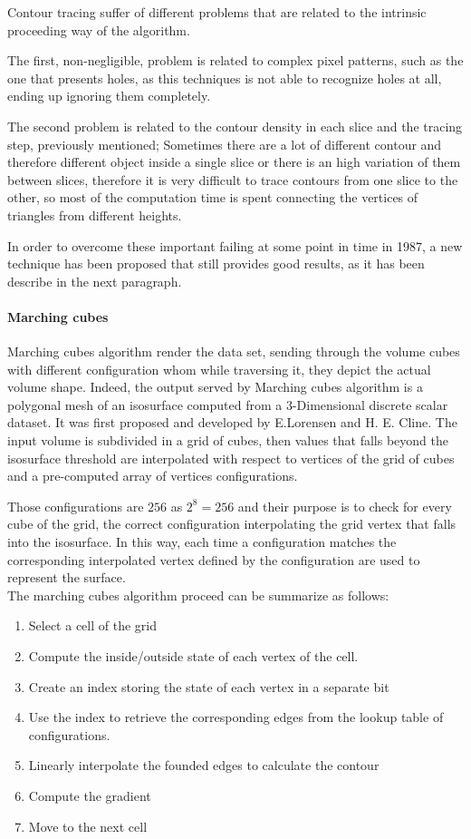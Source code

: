 \documentclass[10pt,a4paper]{article}
\begin{document}
Contour tracing suffer of different problems that are related to the intrinsic  proceeding way of the algorithm.

The first, non-negligible, problem is related to complex pixel patterns, such as the one that presents holes, as this techniques is not able to recognize holes at all, ending up ignoring them completely.

The second problem is related to the contour density in each slice and the tracing step, previously mentioned; Sometimes there are a lot of different contour and therefore different object inside a single slice or there is an high variation of them between slices, therefore it is very difficult to trace contours from one slice to the other, so most of the computation time is spent connecting the vertices of triangles from different heights.

In order to overcome these important failing at some point in time in 1987, a new technique has been proposed that still provides good results, as it has been describe in the next paragraph.
  

\paragraph{Marching cubes}
Marching cubes algorithm render the data set, sending through the volume cubes with different configuration whom while traversing it, they depict the actual volume shape. Indeed, the output served by Marching cubes algorithm is a polygonal mesh of an isosurface computed from a 3-Dimensional discrete scalar dataset. It was first proposed and developed by E.Lorensen and H. E. Cline. The input volume is subdivided in a grid of cubes, then values that falls beyond the isosurface threshold are interpolated with respect to vertices of the grid of cubes and a pre-computed array of vertices configurations.

Those configurations are $256$ as $2^8 = 256$ and their purpose is to check for every cube of the grid, the correct configuration interpolating the grid vertex that falls into the isosurface. In this way, each time a configuration matches the corresponding interpolated vertex defined by the configuration are used to represent the surface.\\
The marching cubes algorithm proceed can be summarize as follows:
\begin{enumerate}
\item Select a cell of the grid
\item Compute the inside/outside state of each vertex of the cell.
\item Create an index storing the state of each vertex in a separate bit
\item Use the index to retrieve the corresponding edges from the lookup table of configurations.
\item Linearly interpolate the founded edges to calculate the contour
\item Compute the gradient
\item Move to the next cell
\end{enumerate}
\end{document}
